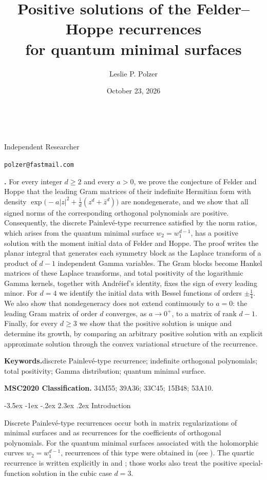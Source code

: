 \documentclass[twoside,10pt]{article}
\title{Positive solutions of the Felder--Hoppe recurrences\\
for quantum minimal surfaces}
\author{Leslie P. Polzer}
\date{October 23, 2026}
\makeatletter
\numberwithin{equation}{section}
\theoremstyle{slbody}
\theoremstyle{remark}
\newcommand{\ii}{\mathrm i}
\newcommand{\authoraffiliation}{Independent Researcher}
\newcommand{\authoremail}{polzer@fastmail.com}
\renewcommand{\section}{%
  \@startsection{section}{1}{\z@}%
    {-3.5ex \@plus -1ex \@minus -.2ex}%
    {2.3ex \@plus .2ex}%
    {\normalfont\large\bfseries}}
\renewcommand{\maketitle}{%
  \begin{center}
    {\large\bfseries\@title}\\
    \vskip36pt
    \ifx\@author\@empty
      \mbox{}\par
    \else
      {\scshape\@author}\par
      \medskip
      {\small\authoraffiliation}\par
      \smallskip
      {\small\texttt{\authoremail}}\par
      \smallskip
      {\small\@date}\par
    \fi
    \vskip36pt
  \end{center}}
\renewenvironment{abstract}
  {\quotation\noindent\small{\bfseries\abstractname.\enspace}}
  {\endquotation}
\makeatother
\begin{document}
\maketitle

\begin{abstract}
For every integer \(d\geq2\) and every \(a>0\), we prove the conjecture
of Felder and Hoppe that the leading Gram matrices of their indefinite
Hermitian form with density
\(\exp\bigl(-a|z|^2+\frac{\ii}{d}(z^d+\bar z^d)\bigr)\) are
nondegenerate, and we show that all signed norms of the corresponding
orthogonal polynomials are positive.  Consequently, the discrete
Painlev\'e-type recurrence satisfied by the norm ratios, which arises
from the quantum minimal surface \(w_2=w_1^{d-1}\), has a positive
solution with the moment initial data of Felder and Hoppe.  The proof
writes the planar integral that generates each symmetry block as the
Laplace transform of a product of \(d-1\) independent Gamma variables.
The Gram blocks become Hankel matrices of these Laplace transforms, and
total positivity of the logarithmic Gamma kernels, together with
Andr\'eief's identity, fixes the sign of every leading minor.  For
\(d=4\) we identify the initial data with Bessel functions of orders
\(\pm\frac14\).  We also show that nondegeneracy does not extend
continuously to \(a=0\): the leading Gram matrix of order \(d\)
converges, as \(a\to0^+\), to a matrix of rank \(d-1\).  Finally, for every \(d\geq3\) we show that the positive
solution is unique and determine its growth, by comparing an arbitrary
positive solution with an explicit approximate solution through the
convex variational structure of the recurrence.

\vskip5pt
\noindent\textbf{Keywords.}\enspace discrete Painlev\'e-type
recurrence; indefinite orthogonal polynomials; total positivity; Gamma
distribution; quantum minimal surface.

\vskip5pt
\noindent\textbf{MSC2020 Classification.}\enspace
34M55; 39A36; 33C45; 15B48; 53A10.
\end{abstract}

\vskip50pt
\baselineskip=13.5pt
\section{Introduction}

Discrete Painlev\'e-type recurrences occur both in matrix
regularizations of minimal surfaces and as recurrences for the
coefficients of orthogonal polynomials.  For the quantum minimal
surfaces associated with the holomorphic curves \(w_2=w_1^{d-1}\),
recurrences of this type were obtained in
\cite{CornalbaTaylor1998,ArnlindHoppeKontsevich2019,Hoppe2025} (see
\cite[Section~3.1]{FelderHoppe2025}).  The quartic recurrence is written
explicitly in \cite[equation~(38)]{Hoppe2025} and
\cite[Section~5]{ClarksonEtAl2025}; those works also treat the positive
special-function solution in the cubic case \(d=3\).
\end{document}
